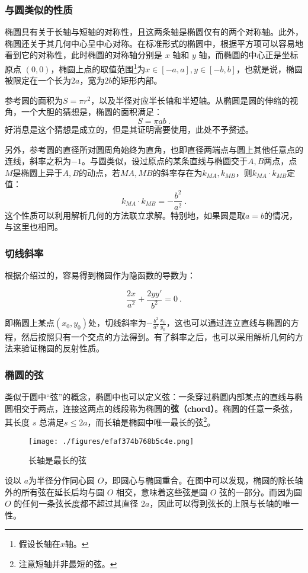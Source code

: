 \subsubsection{与圆类似的性质}

椭圆具有关于长轴与短轴的对称性，且这两条轴是椭圆仅有的两个对称轴。此外，椭圆还关于其几何中心呈中心对称。在标准形式的椭圆中，根据平方项可以容易地看到它的对称性，此时椭圆的对称轴分别是 $x$ 轴和 $y$ 轴，而椭圆的中心正是坐标原点 $(0,0)$，椭圆上点的取值范围\footnote{假设长轴在$x$轴。}为$x\in[-a,a],y\in[-b,b]$，也就是说，椭圆被限定在一个长为$2a$，宽为$2b$的矩形内部。

参考圆的面积为$S = \pi r^2$，以及半径对应半长轴和半短轴。从椭圆是圆的伸缩的视角，一个大胆的猜想是，椭圆的面积满足：
\begin{equation}
S = \pi a b~.
\end{equation}
好消息是这个猜想是成立的，但是其证明需要使用，此处不予赘述。

另外，参考圆的直径所对圆周角始终为直角，也即直径两端点与圆上其他任意点的连线，斜率之积为$-1$。与圆类似，设过原点的某条直线与椭圆交于$A,B$两点，点$M$是椭圆上异于$A,B$的动点，若$MA,MB$的斜率存在为$k_{MA},k_{MB}$，则$k_{MA}\cdot k_{MB}$定值：
\begin{equation}
k_{MA} \cdot k_{MB} = -\frac{b^2}{a^2}~.
\end{equation}
这个性质可以利用解析几何的方法联立求解。特别地，如果圆是取$a=b$的情况，与这里也相同。

\subsubsection{切线斜率}

根据介绍过的，容易得到椭圆作为隐函数的导数为：

\begin{equation}
\frac{2x}{a^2} + \frac{2yy'}{b^2} = 0~.
\end{equation}

即椭圆上某点$(x_0,y_0)$处，切线斜率为$\displaystyle-\frac{b^2}{a^2}\frac{x_0}{y_0}$，这也可以通过连立直线与椭圆的方程，然后按照只有一个交点的方法得到。有了斜率之后，也可以采用解析几何的方法来验证椭圆的反射性质。

\subsubsection{椭圆的弦}

类似于圆中“弦”的概念，椭圆中也可以定义弦：一条穿过椭圆内部某点的直线与椭圆相交于两点，连接这两点的线段称为椭圆的\textbf{弦（chord）}。椭圆的任意一条弦，其长度 $s$ 总满足$s\leq2a$，而长轴是椭圆中唯一最长的弦\footnote{注意短轴并非最短的弦。}。
\begin{figure}[ht]
\centering
\texttt{[image: ./figures/efaf374b768b5c4e.png]}
\caption{长轴是最长的弦} \label{fig_Elips3_4}
\end{figure}
设以 $a$为半径分作同心圆 $O$，即圆心与椭圆重合。在图中可以发现，椭圆的除长轴外的所有弦在延长后均与圆 $O$ 相交，意味着这些弦是圆 $O$ 弦的一部分。而因为圆 $O$ 的任何一条弦长度都不超过其直径 $2a$，因此可以得到弦长的上限与长轴的唯一性。

